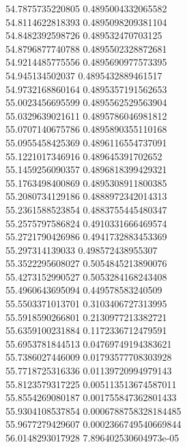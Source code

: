 {54.7875735220805 0.4895004332065582
 \\
54.8114622818393 0.4895098209381104
 \\
54.8482392598726 0.489532470703125
 \\
54.8796877740788 0.4895502328872681
 \\
54.9214485775556 0.4895690977573395
 \\
54.945134502037 0.4895432889461517
 \\
54.9732168860164 0.4895357191562653
 \\
55.0023456695599 0.4895562529563904
 \\
55.0329639021611 0.4895786046981812
 \\
55.0707140675786 0.4895890355110168
 \\
55.0955458425369 0.4896116554737091
 \\
55.1221017346916 0.489645391702652
 \\
55.1459256090357 0.4896818399429321
 \\
55.1763498400869 0.4895308911800385
 \\
55.2080734129186 0.4888972342014313
 \\
55.2361588523854 0.4883755445480347
 \\
55.2575797586824 0.4910331666469574
 \\
55.2721790426986 0.4941732883453369
 \\
55.297314139033 0.498572438955307
 \\
55.3522295608027 0.5054845213890076
 \\
55.4273152990527 0.5053284168243408
 \\
55.4960643695094 0.449578583240509
 \\
55.5503371013701 0.3103406727313995
 \\
55.5918590266801 0.2130977213382721
 \\
55.6359100231884 0.1172336712479591
 \\
55.6953781844513 0.04769749194383621
 \\
55.7386027446009 0.01793577708303928
 \\
55.7718725316336 0.01139720994979143
 \\
55.8123579317225 0.005113513674587011
 \\
55.8554269080187 0.001755847362801433
 \\
55.9304108537854 0.0006788758328184485
 \\
55.9677279429607 0.0002366749540669844
 \\
56.0148293017928 7.896402530604973e-05
}
